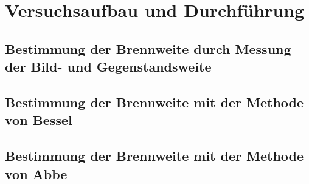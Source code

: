 \section{Versuchsaufbau und Durchführung}

\subsection{Bestimmung der Brennweite durch Messung der Bild- und Gegenstandsweite}

\subsection{Bestimmung der Brennweite mit der Methode von Bessel}

\subsection{Bestimmung der Brennweite mit der Methode von Abbe}





